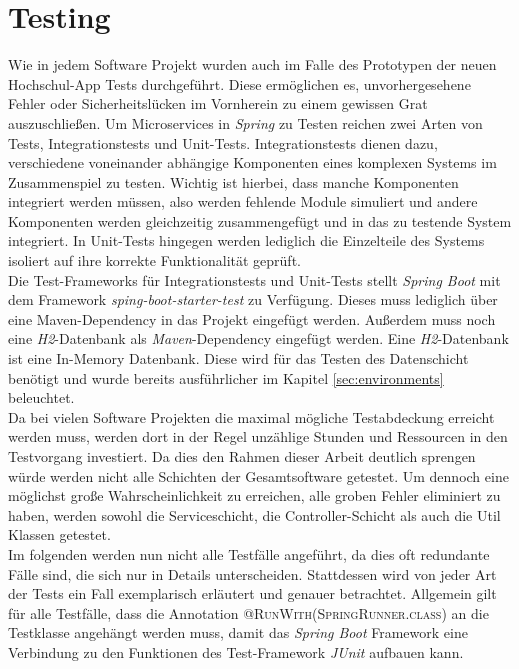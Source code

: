 \chapter{Testing}
\label{sec:test}

Wie in jedem Software Projekt wurden auch im Falle des Prototypen der neuen Hochschul-\ac{App} Tests durchgeführt. Diese ermöglichen es, unvorhergesehene Fehler oder Sicherheitslücken im Vornherein zu einem gewissen Grat auszuschließen. Um Microservices in \textit{Spring} zu Testen reichen zwei Arten von Tests, Integrationstests und Unit-Tests. Integrationstests dienen dazu, verschiedene voneinander abhängige Komponenten eines komplexen Systems im Zusammenspiel zu testen. Wichtig ist hierbei, dass manche Komponenten integriert werden müssen, also werden fehlende Module simuliert und andere Komponenten werden gleichzeitig zusammengefügt und in das zu testende System integriert. In Unit-Tests hingegen werden lediglich die Einzelteile des Systems isoliert auf ihre korrekte Funktionalität geprüft.\\
\linebreak
Die Test-Frameworks für Integrationstests und Unit-Tests stellt \textit{Spring Boot} mit dem Framework \textit{sping-boot-starter-test} zu Verfügung. Dieses muss lediglich über eine Maven-Dependency in das Projekt eingefügt werden. Außerdem muss noch eine \textit{H2}-Datenbank als \textit{Maven}-Dependency eingefügt werden. Eine \textit{H2}-Datenbank ist eine In-Memory Datenbank. Diese wird für das Testen des Datenschicht benötigt und wurde bereits ausführlicher im Kapitel \ref{sec:environments} beleuchtet.\\
\linebreak
Da bei vielen Software Projekten die maximal mögliche Testabdeckung erreicht werden muss, werden dort in der Regel unzählige Stunden und Ressourcen in den Testvorgang investiert. Da dies den Rahmen dieser Arbeit deutlich sprengen würde werden nicht alle Schichten der Gesamtsoftware getestet. Um dennoch eine möglichst große Wahrscheinlichkeit zu erreichen, alle groben Fehler eliminiert zu haben, werden sowohl die Serviceschicht, die Controller-Schicht als auch die Util Klassen getestet.\\
\linebreak
Im folgenden werden nun nicht alle Testfälle angeführt, da dies oft redundante Fälle sind, die sich nur in Details unterscheiden. Stattdessen wird von jeder Art der Tests ein Fall exemplarisch erläutert und genauer betrachtet. Allgemein gilt für alle Testfälle, dass die Annotation \textsc{@RunWith(SpringRunner.class)} an die Testklasse angehängt werden muss, damit das \textit{Spring Boot} Framework eine Verbindung zu den Funktionen des Test-Framework \textit{JUnit} aufbauen kann.

